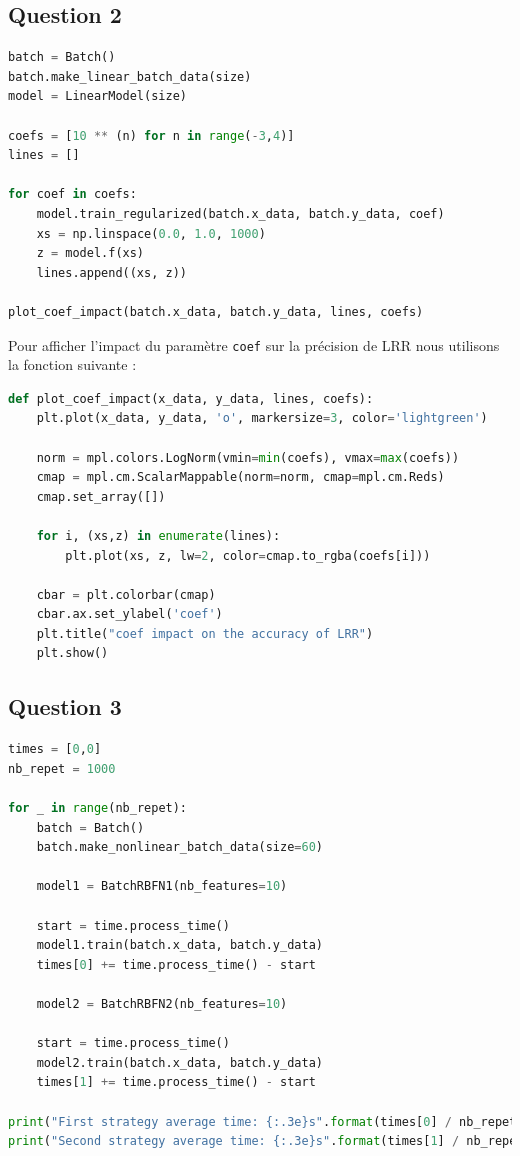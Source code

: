\documentclass[french,12pt]{article}
\begin{document}
\subsection*{Question 2}

\begin{lstlisting}[language=Python]
batch = Batch()
batch.make_linear_batch_data(size)
model = LinearModel(size)

coefs = [10 ** (n) for n in range(-3,4)]
lines = []

for coef in coefs:
    model.train_regularized(batch.x_data, batch.y_data, coef)
    xs = np.linspace(0.0, 1.0, 1000)
    z = model.f(xs)
    lines.append((xs, z))

plot_coef_impact(batch.x_data, batch.y_data, lines, coefs) 
\end{lstlisting}
\bigskip

\noindent Pour afficher l'impact du paramètre \lstinline{coef} sur la précision de LRR nous utilisons la fonction suivante :
\bigskip

\begin{lstlisting}[language=Python]
def plot_coef_impact(x_data, y_data, lines, coefs):
	plt.plot(x_data, y_data, 'o', markersize=3, color='lightgreen')

	norm = mpl.colors.LogNorm(vmin=min(coefs), vmax=max(coefs))
	cmap = mpl.cm.ScalarMappable(norm=norm, cmap=mpl.cm.Reds)
	cmap.set_array([])

	for i, (xs,z) in enumerate(lines):
		plt.plot(xs, z, lw=2, color=cmap.to_rgba(coefs[i]))

	cbar = plt.colorbar(cmap)
	cbar.ax.set_ylabel('coef')
	plt.title("coef impact on the accuracy of LRR")
	plt.show()
\end{lstlisting}

\subsection*{Question 3}

\begin{lstlisting}[language=Python]
times = [0,0]
nb_repet = 1000

for _ in range(nb_repet):
    batch = Batch()
    batch.make_nonlinear_batch_data(size=60)
    
    model1 = BatchRBFN1(nb_features=10)

    start = time.process_time()
    model1.train(batch.x_data, batch.y_data)
    times[0] += time.process_time() - start
    
    model2 = BatchRBFN2(nb_features=10)

    start = time.process_time()
    model2.train(batch.x_data, batch.y_data)
    times[1] += time.process_time() - start

print("First strategy average time: {:.3e}s".format(times[0] / nb_repet))
print("Second strategy average time: {:.3e}s".format(times[1] / nb_repet))
\end{lstlisting}
\end{document}
